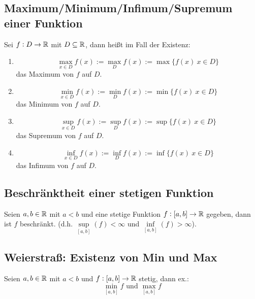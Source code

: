 \subsection{Maximum/Minimum/Infimum/Supremum einer Funktion}
Sei $f: D \rightarrow \mathbb{R}$ mit $D \subseteq \mathbb{R}$, dann heißt im Fall der
Existenz:
\begin{enumerate}[label= (\alph*)]
    \item
        \begin{equation*}
            \max\limits_{x \in D} f(x)
            := \max\limits_{D} f(x) := \max \{ f(x)\ x \in D \}
        \end{equation*}
        das Maximum von $f$ auf $D$.
    \item
        \begin{equation*}
            \min\limits_{x \in D} f(x) := \min\limits_{D} f(x)
            := \min \{ f(x)\ x \in D \}
        \end{equation*}
        das Minimum von $f$ auf $D$.
    \item
        \begin{equation*}
            \sup\limits_{x \in D} f(x)
            := \sup\limits_{D} f(x) := \sup \{ f(x)\ x \in D \}
        \end{equation*}
        das Supremum von $f$ auf $D$.
    \item
        \begin{equation*}
            \inf\limits_{x \in D} f(x) := \inf\limits_{D} f(x)
            := \inf \{ f(x)\ x \in D \}
        \end{equation*}
        das Infimum von $f$ auf $D$.
\end{enumerate}

\subsection{Beschränktheit einer stetigen Funktion}
Seien $a, b \in \mathbb{R}$ mit $a < b$ und eine stetige Funktion
$f: [a, b] \rightarrow \mathbb{R}$ gegeben, dann ist $f$ beschränkt.
(d.h. $\sup\limits_{[a, b]} (f) < \infty$ und $\inf\limits_{[a, b]}  (f)> \infty$).

\subsection{Weierstraß: Existenz von Min und Max}
Seien $a, b \in \mathbb{R}$ mit $a < b$ und $f: [a, b] \rightarrow \mathbb{R}$ stetig,
dann ex.:
\begin{equation*}
    \min_{[a, b]} f \text{ und } \max_{[a, b]} f
\end{equation*}

